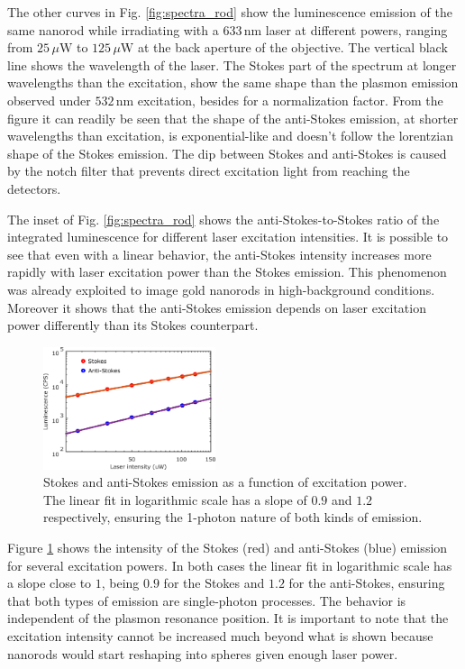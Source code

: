 \documentclass[journal=nalefd,manuscript=letter]{achemso}
\newcommand{\nm}{\ensuremath{\,\textrm{nm}}}
\newcommand{\uW}{\ensuremath{\,\mu\textrm{W}}}
\begin{document}
The other curves in Fig. \ref{fig:spectra_rod} show the luminescence emission of
the same nanorod while irradiating with a $633\nm$ laser at different powers,
ranging from $25\uW$ to $125\uW$ at the back aperture of the objective. The
vertical black line shows the wavelength of the laser. The Stokes part of the
spectrum at longer wavelengths than the excitation, show the same shape than the
plasmon emission observed under $532\nm$ excitation, besides for a normalization
factor. From the figure it can readily be seen that the shape of the anti-Stokes
emission, at shorter wavelengths than excitation, is exponential-like and
doesn't follow the lorentzian shape of the Stokes emission. The dip between
Stokes and anti-Stokes is caused by the notch filter that prevents direct
excitation light from reaching the detectors.

The inset of Fig. \ref{fig:spectra_rod} shows the anti-Stokes-to-Stokes ratio of
the integrated luminescence for different laser excitation intensities. It is
possible to see that even with a linear behavior, the anti-Stokes intensity
increases more rapidly with laser excitation power than the Stokes emission.
This phenomenon was already exploited to image gold nanorods in high-background
conditions. Moreover it shows that the anti-Stokes emission depends on
laser excitation power differently than its Stokes counterpart. 

\begin{figure}[htp] \centering
\includegraphics[width=0.45\textwidth]{Figures/Supplementary/01_AS_S_in_Log/01_AS_S_in_Log.png}
\caption{Stokes and anti-Stokes emission as a function of excitation power. The
linear fit in logarithmic scale has a slope of $0.9$ and $1.2$ respectively,
ensuring the 1-photon nature of both kinds of emission.}
	\label{fig:Log_Plot}
\end{figure}

Figure \ref{fig:Log_Plot} shows the intensity of the Stokes (red) and
anti-Stokes (blue) emission for several excitation powers. In both cases the
linear fit in logarithmic scale has a slope close to $1$, being $0.9$ for the
Stokes and $1.2$ for the anti-Stokes, ensuring that both types of emission are
single-photon processes. The behavior is independent of the plasmon resonance
position. It is important to note that the excitation intensity cannot be
increased much beyond what is shown because nanorods would start reshaping into
spheres given enough laser power.
\end{document}
